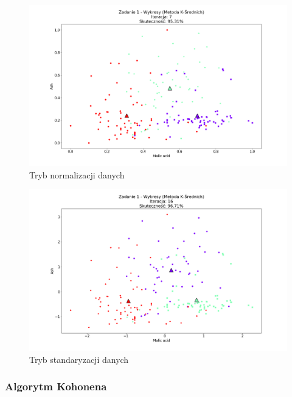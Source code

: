 \documentclass{classrep}
\begin{document}
{{{				\begin{figure}[!htbp]
					\centering
					\includegraphics[width=\textwidth,width=95mm]{wykresy/plot_k_meansWineNormalised.png}
					\caption{Tryb normalizacji danych}
				\end{figure}
		
				\begin{figure}[!htbp]
					\centering
					\includegraphics[width=\textwidth,width=95mm]{wykresy/plot_k_meansWineStandardise.png}
					\caption{Tryb standaryzacji danych}
				\end{figure}
			\FloatBarrier
		}

		\subsubsection{Algorytm Kohonena}
		{

		}

}}
\end{document}

